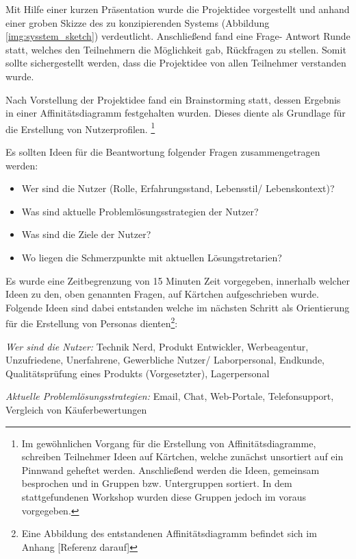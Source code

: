 Mit Hilfe einer kurzen Präsentation wurde die Projektidee vorgestellt und anhand einer groben Skizze des zu konzipierenden Systems (Abbildung \ref{img:sysstem_sketch}) verdeutlicht. 
Anschließend fand eine Frage- Antwort Runde statt, welches den Teilnehmern die Möglichkeit gab, Rückfragen zu stellen. Somit sollte sichergestellt werden, dass die Projektidee von 
allen Teilnehmer verstanden wurde. 

Nach Vorstellung der Projektidee fand ein Brainstorming statt, dessen Ergebnis in einer Affinitätsdiagramm festgehalten wurden. Dieses diente als Grundlage für die Erstellung von Nutzerprofilen. 
\footnote{Im gewöhnlichen Vorgang für die Erstellung von Affinitätsdiagramme, schreiben Teilnehmer Ideen auf Kärtchen, welche zunächst unsortiert auf ein Pinnwand geheftet werden. 
Anschließend werden die Ideen, gemeinsam besprochen und in Gruppen bzw. Untergruppen sortiert. In dem stattgefundenen Workshop wurden diese Gruppen jedoch im voraus vorgegeben.}

Es sollten Ideen für die Beantwortung folgender Fragen zusammengetragen werden: 

\begin{itemize}
	\item Wer sind die Nutzer (Rolle, Erfahrungsstand,  Lebensstil/ Lebenskontext)?
	\item Was sind aktuelle Problemlösungsstrategien der Nutzer?
	\item Was sind die Ziele der Nutzer?
	\item Wo liegen die Schmerzpunkte mit aktuellen Lösungstretarien?
\end{itemize}\label{list:AffiDiagramm}

Es wurde eine Zeitbegrenzung von 15 Minuten Zeit vorgegeben, innerhalb welcher Ideen zu den, oben genannten Fragen, auf Kärtchen aufgeschrieben wurde.
Folgende Ideen sind dabei entstanden welche im nächsten Schritt als Orientierung für die Erstellung von Personas dienten\footnote{Eine Abbildung des entstandenen Affinitätsdiagramm befindet sich im Anhang [Referenz darauf]}: 

\vspace{2mm}
\textit{Wer sind die Nutzer:} 
Technik Nerd, Produkt Entwickler, Werbeagentur, Unzufriedene, Unerfahrene, Gewerbliche Nutzer/ Laborpersonal, Endkunde, Qualitätsprüfung eines Produkts (Vorgesetzter), Lagerpersonal

\vspace{2mm}
\textit{Aktuelle Problemlösungsstrategien:} 
Email, Chat, Web-Portale, Telefonsupport, Vergleich von Käuferbewertungen

